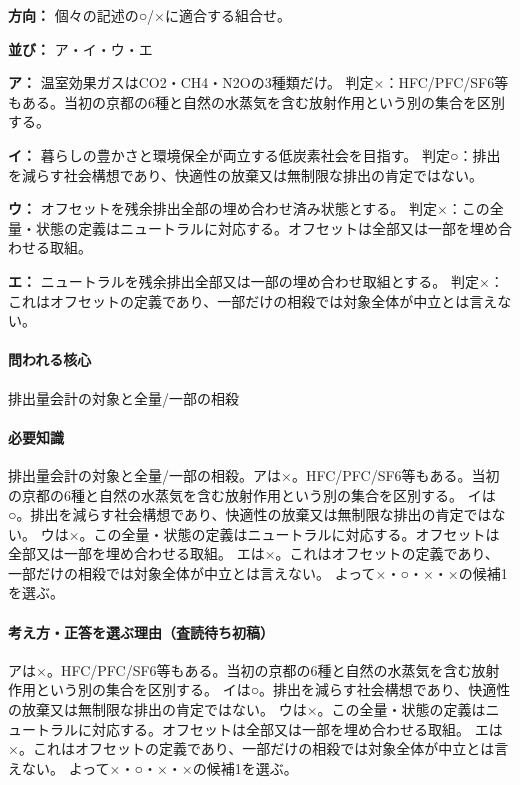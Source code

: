 \noindent\textbf{方向：} 個々の記述の○/×に適合する組合せ。\par

\noindent\textbf{並び：} ア・イ・ウ・エ\par

\noindent\textbf{ア：} 温室効果ガスはCO2・CH4・N2Oの3種類だけ。 判定×：HFC/PFC/SF6等もある。当初の京都の6種と自然の水蒸気を含む放射作用という別の集合を区別する。\par

\noindent\textbf{イ：} 暮らしの豊かさと環境保全が両立する低炭素社会を目指す。 判定○：排出を減らす社会構想であり、快適性の放棄又は無制限な排出の肯定ではない。\par

\noindent\textbf{ウ：} オフセットを残余排出全部の埋め合わせ済み状態とする。 判定×：この全量・状態の定義はニュートラルに対応する。オフセットは全部又は一部を埋め合わせる取組。\par

\noindent\textbf{エ：} ニュートラルを残余排出全部又は一部の埋め合わせ取組とする。 判定×：これはオフセットの定義であり、一部だけの相殺では対象全体が中立とは言えない。\par

\paragraph{問われる核心} 排出量会計の対象と全量/一部の相殺

\paragraph{必要知識} 排出量会計の対象と全量/一部の相殺。アは×。HFC/PFC/SF6等もある。当初の京都の6種と自然の水蒸気を含む放射作用という別の集合を区別する。 イは○。排出を減らす社会構想であり、快適性の放棄又は無制限な排出の肯定ではない。 ウは×。この全量・状態の定義はニュートラルに対応する。オフセットは全部又は一部を埋め合わせる取組。 エは×。これはオフセットの定義であり、一部だけの相殺では対象全体が中立とは言えない。 よって×・○・×・×の候補1を選ぶ。

\paragraph{考え方・正答を選ぶ理由（査読待ち初稿）} アは×。HFC/PFC/SF6等もある。当初の京都の6種と自然の水蒸気を含む放射作用という別の集合を区別する。 イは○。排出を減らす社会構想であり、快適性の放棄又は無制限な排出の肯定ではない。 ウは×。この全量・状態の定義はニュートラルに対応する。オフセットは全部又は一部を埋め合わせる取組。 エは×。これはオフセットの定義であり、一部だけの相殺では対象全体が中立とは言えない。 よって×・○・×・×の候補1を選ぶ。

